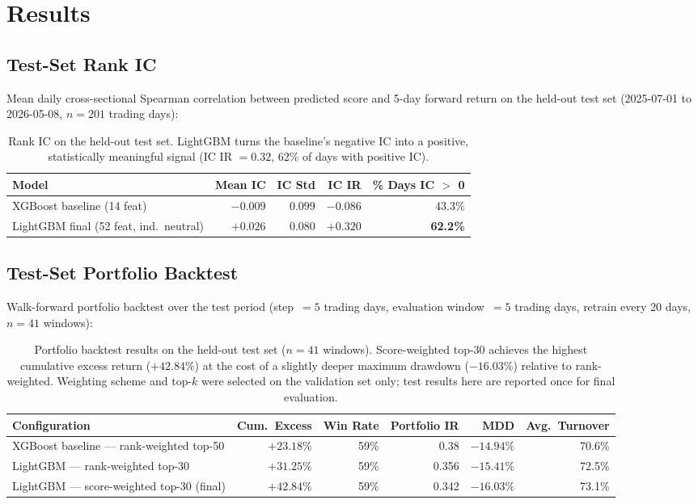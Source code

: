 \documentclass[11pt,a4paper]{article}
\begin{document}
\section{Results}

\subsection{Test-Set Rank IC}

Mean daily cross-sectional Spearman correlation between predicted score
and 5-day forward return on the held-out test set (2025-07-01 to
2026-05-08, $n = 201$ trading days):

\begin{table}[h]
\centering
\begin{tabular}{lrrrr}
\toprule
Model & Mean IC & IC Std & IC IR & \% Days IC $>$ 0 \\
\midrule
XGBoost baseline (14 feat) & $-0.009$ & $0.099$ & $-0.086$ & 43.3\% \\
LightGBM final (52 feat, ind.\ neutral) & $\mathbf{+0.026}$ & $0.080$ & $\mathbf{+0.320}$ & \textbf{62.2\%} \\
\bottomrule
\end{tabular}
\caption{Rank IC on the held-out test set. LightGBM turns the baseline's
negative IC into a positive, statistically meaningful signal (IC IR
$= 0.32$, 62\% of days with positive IC).}
\end{table}

\subsection{Test-Set Portfolio Backtest}

Walk-forward portfolio backtest over the test period (step~$= 5$ trading
days, evaluation window~$= 5$ trading days, retrain every 20 days,
$n = 41$ windows):

\begin{table}[h]
\centering
\begin{tabular}{lrrrrr}
\toprule
Configuration & Cum.\ Excess & Win Rate & Portfolio IR & MDD & Avg.\ Turnover \\
\midrule
XGBoost baseline --- rank-weighted top-50
  & $+23.18\%$ & 59\% & 0.38 & $-14.94\%$ & 70.6\% \\
LightGBM --- rank-weighted top-30
  & $+31.25\%$ & 59\% & 0.356 & $-15.41\%$ & 72.5\% \\
LightGBM --- score-weighted top-30 (final)
  & $\mathbf{+42.84\%}$ & 59\% & 0.342 & $-16.03\%$ & 73.1\% \\
\bottomrule
\end{tabular}
\caption{Portfolio backtest results on the held-out test set ($n=41$ windows).
Score-weighted top-30 achieves the highest cumulative excess return ($+42.84\%$)
at the cost of a slightly deeper maximum drawdown ($-16.03\%$) relative to
rank-weighted. Weighting scheme and top-$k$ were selected on the validation
set only; test results here are reported once for final evaluation.}
\end{table}
\end{document}
